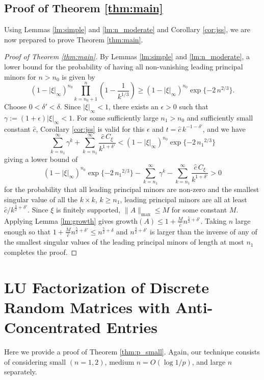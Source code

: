 \documentclass[reqno]{amsart}
\numberwithin{equation}{section}
\begin{document}
\subsection{Proof of Theorem \ref{thm:main}}
Using Lemmas \ref{lm:simple} and \ref{lm:n_moderate} and Corollary \ref{cor:jss}, we are now prepared to prove Theorem \ref{thm:main}.


\begin{proof}[Proof of Theorem \ref{thm:main}]
By Lemmas \ref{lm:simple} and \ref{lm:n_moderate}, a lower bound for the probability of having all non-vanishing leading principal minors for $n> n_0$ is given by
\[(1-|\xi|_\infty)^{n_0} \prod_{k = n_0+1}^{n} \left(1 - \frac{1}{k^{1/3}}\right) \ge (1-|\xi|_\infty)^{n_0} \exp\{-2 \, n^{2/3}\}.\]
Choose $0 < \delta' < \delta$. Since $|\xi|_\infty < 1$, there exists an $\epsilon > 0$ such that $\gamma := (1+\epsilon)|\xi|_\infty < 1$. For some sufficiently large $n_1 > n_0$ and sufficiently small constant $\hat c$, Corollary \ref{cor:jss} is valid for this $\epsilon$ and $t = \hat c \, k^{-1-\delta'}$, and we have 
\[
\sum_{k = n_1}^\infty \gamma^{k}  + \sum_{k = n_1}^\infty \frac{\hat c \,  C_\xi }{k^{1+\delta'}} <  (1-|\xi|_\infty)^{n_0} \exp\{-2 \, {n_1}^{2/3}\}
\]
giving a lower bound of
\[
(1-|\xi|_\infty)^{n_0} \exp\{-2 \, {n_1}^{2/3}\} - \sum_{k = n_1}^\infty \gamma^{k} -  \sum_{k = n_1}^\infty \frac{\hat c \,  C_\xi }{k^{1+\delta'}} >0
\]
for the probability that all leading principal minors are non-zero and the smallest singular value of all the $k\times k$, $k \ge n_1$, leading principal minors are all at least $\hat c/k^{\frac{3}{2}+\delta'}$. Since $\xi$ is finitely supported, $\|A\|_{\max} \le M$ for some constant $M$. Applying Lemma \ref{lm:growth} gives $\mathrm{growth}(A) \le 1 + \frac{M}{\hat c} n^{\frac{5}{2}+\delta'}$. Taking $n$ large enough so that $1 + \frac{M}{\hat c} n^{\frac{5}{2}+\delta'} \le n^{\frac{5}{2}+\delta}$ and $n^{\frac{3}{2} + \delta'}$ is larger than the inverse of any of the smallest singular values of the leading principal minors of length at most $n_1$ completes the proof.
\end{proof}


\section{LU Factorization of Discrete Random Matrices with Anti-Concentrated Entries}\label{sec:anti_concentrated}

Here we provide a proof of Theorem \ref{thm:p_small}. Again, our technique consists of considering small $(n = 1,2)$, medium $n = O(\log 1/p)$, and large $n$ separately.
\end{document}
